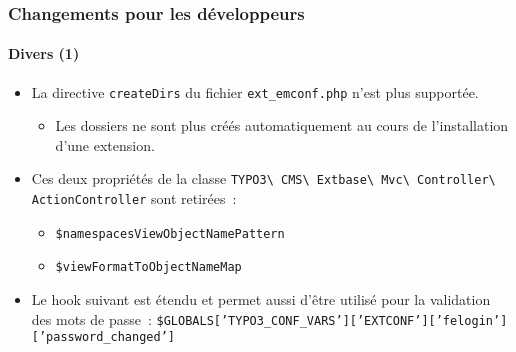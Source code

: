\begin{frame}[fragile]
	\frametitle{Changements pour les développeurs}
	\framesubtitle{Divers (1)}

	\begin{itemize}
		\item La directive \texttt{createDirs} du fichier \texttt{ext\_emconf.php} n'est plus supportée.

			\begin{itemize}\smaller
				\item[\ding{228}] Les dossiers ne sont plus créés automatiquement au cours de l'installation d'une extension.
			\end{itemize}\normalsize

		\item Ces deux propriétés de la classe
			\texttt{TYPO3\textbackslash
				CMS\textbackslash
				Extbase\textbackslash
				Mvc\textbackslash
				Controller\textbackslash
				ActionController}\newline
			sont retirées~:

			\begin{itemize}
				\item \texttt{\$namespacesViewObjectNamePattern}
				\item \texttt{\$viewFormatToObjectNameMap}
			\end{itemize}

		\item Le hook suivant est étendu et permet aussi d'être utilisé pour la validation des mots de passe~:\newline
			{\fontsize{8}{10} \selectfont \texttt{\$GLOBALS['TYPO3\_CONF\_VARS']['EXTCONF']['felogin']['password\_changed']}}

	\end{itemize}

\end{frame}



